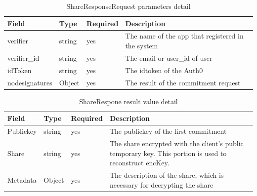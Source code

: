 \documentclass[../Main.tex]{subfiles}
\begin{document}
\begin{table}[H]
  \begin{tabular}{|l|l|l|p{8cm}|}
\hline
\rowcolor[HTML]{F56B00} 
\textbf{Field} & \textbf{Type} & \textbf{Required} & \textbf{Description}                              \\ \hline
verifier       & string        & yes               & The name of the app that registered in the system \\ \hline
verifier\_id   & string        & yes               & The email or user\_id of user                     \\ \hline
idToken        & string        & yes               & The idtoken of the Auth0                          \\ \hline
nodesignatures & Object        & yes               & The result of the commitment request              \\ \hline
\end{tabular}
  \caption{ShareResponseRequest parameters detail}
  \label{shareresponserequest-params-detail}
\end{table}

\begin{table}[H]
  \centering
  \begin{tabular}{|l|l|l|p{8cm}|}
\hline
\rowcolor[HTML]{F56B00} 
\textbf{Field} & \textbf{Type} & \textbf{Required} & \textbf{Description}                                                                                    \\ \hline
Publickey      & string        & yes               & The publickey of the first commitment                                                                   \\ \hline
Share          & string        & yes               & The share encrypted with the client's public temporary key. This portion is used to reconstruct encKey. \\ \hline
Metadata       & Object        & yes               & The description of the share, which is necessary for decrypting the share
\end{tabular}
  \caption{ShareRespone result value detail}
  \label{sharereponserequest-response-detail}
\end{table}
\end{document}
